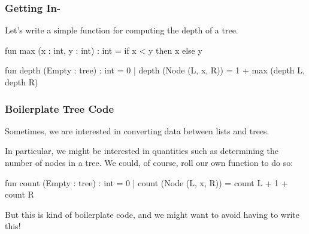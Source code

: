 \documentclass[aspectratio=169]{beamer}
\begin{document}
\begin{frame}[fragile]
  \frametitle{Getting In-}

  Let's write a simple function for computing the depth of a tree.

  \pause
  \begin{codeblock}
    fun max (x : int, y : int) : int =
      if x < y then x else y

    fun depth (Empty : tree) : int = 0
      | depth (Node (L, x, R)) = 1 + max (depth L, depth R) 
  \end{codeblock}

  \vspace{\fill}


\end{frame}


\begin{frame}[fragile]
  \frametitle{Boilerplate Tree Code}

  Sometimes, we are interested in converting data between lists and trees.

  \pause
  \vspace{\fill}

  In particular, we might be interested in quantities such as determining the
  number of nodes in a tree. We could, of course, roll our own function to do
  so:

  \pause
  \begin{codeblock}
    fun count (Empty : tree) : int = 0 
      | count (Node (L, x, R)) = count L + 1 + count R
  \end{codeblock}

  \pause
  \vspace{\fill}

  But this is kind of boilerplate code, and we might want to avoid having to
  write this!  
\end{frame}
\end{document}
